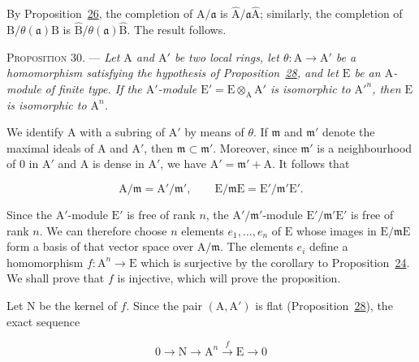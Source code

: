 By Proposition~\hyperref[gaga:prop:26]{26}, the completion of
$\mathrm{A}/\mathfrak{a}$ is $\widehat{\mathrm{A}}/\mathfrak{a}\widehat{\mathrm{A}}$; similarly, the
completion of $\mathrm{B}/\theta(\mathfrak{a})\mathrm{B}$ is
$\widehat{\mathrm{B}}/\theta(\mathfrak{a})\widehat{\mathrm{B}}$. The result follows.

\textsc{Proposition 30}. --- \emph{Let $\mathrm{A}$ and $\mathrm{A}'$
be two local rings, let $\theta:\mathrm{A}\to \mathrm{A}'$ be a homomorphism satisfying the
hypothesis of Proposition~\hyperref[gaga:prop:28]{28}, and let $\mathrm{E}$ be an
$\mathrm{A}$-module of finite type. If the $\mathrm{A}'$-module
$\mathrm{E}'=\mathrm{E}\otimes_\mathrm{A}\mathrm{A}'$ is isomorphic to ${\mathrm{A}'}^n$, then $\mathrm{E}$ is isomorphic to
$\mathrm{A}^n$.}

We identify $\mathrm{A}$ with a subring of $\mathrm{A}'$ by means of $\theta$. If
$\mathfrak{m}$ and $\mathfrak{m}'$ denote the maximal ideals of $\mathrm{A}$ and $\mathrm{A}'$,
then $\mathfrak{m}\subset\mathfrak{m}'$. Moreover, since $\mathfrak{m}'$ is a
neighbourhood of $0$ in $\mathrm{A}'$ and $\mathrm{A}$ is dense in $\mathrm{A}'$, we have
$\mathrm{A}'=\mathfrak{m}'+\mathrm{A}$. It follows that

\begin{equation*}
\mathrm{A}/\mathfrak{m}=\mathrm{A}'/\mathfrak{m}',
\qquad
\mathrm{E}/\mathfrak{m}\mathrm{E}=\mathrm{E}'/\mathfrak{m}'\mathrm{E}'.
\end{equation*}

Since the $\mathrm{A}'$-module $\mathrm{E}'$ is free of rank $n$, the
$\mathrm{A}'/\mathfrak{m}'$-module $\mathrm{E}'/\mathfrak{m}'\mathrm{E}'$ is free of rank $n$. We can
therefore choose $n$ elements $e_1,\ldots,e_n$ of $\mathrm{E}$ whose images in
$\mathrm{E}/\mathfrak{m}\mathrm{E}$ form a basis of that vector space over
$\mathrm{A}/\mathfrak{m}$. The elements $e_i$ define a homomorphism
$f:\mathrm{A}^n\to \mathrm{E}$ which is surjective by the corollary to
Proposition~\hyperref[gaga:prop:24]{24}. We shall prove that $f$ is injective,
which will prove the proposition.

Let $\mathrm{N}$ be the kernel of $f$. Since the pair $(\mathrm{A},\mathrm{A}')$ is flat
(Proposition~\hyperref[gaga:prop:28]{28}), the exact sequence

\begin{equation*}
0\longrightarrow \mathrm{N}\longrightarrow \mathrm{A}^n\xrightarrow{f}\mathrm{E}\longrightarrow0
\end{equation*}


